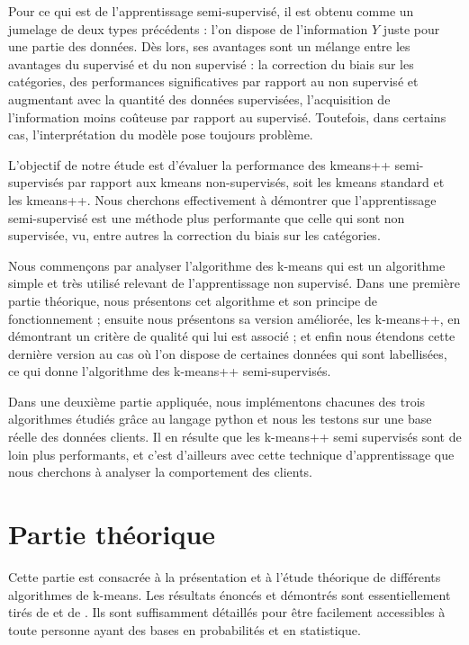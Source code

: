 \documentclass[12pt,a4paper]{book}
\newcommand{\1}{\mathds{1}}
\begin{document}
Pour ce qui est de l'apprentissage semi-supervisé, il est obtenu comme un jumelage de deux types précédents : l'on dispose de l'information $Y$ juste pour une partie des données. Dès lors, ses avantages sont un mélange entre les avantages du supervisé et du non supervisé : la correction du biais sur les catégories, des performances significatives par rapport au non supervisé et augmentant avec la quantité des données supervisées, l'acquisition de l'information moins coûteuse par rapport au supervisé. Toutefois, dans certains cas, l'interprétation du modèle pose toujours problème.


L'objectif de notre étude est d'évaluer la performance des kmeans++ semi-supervisés par rapport aux kmeans non-supervisés, soit les kmeans standard et les kmeans++. Nous cherchons effectivement à démontrer que l'apprentissage semi-supervisé est une méthode plus performante que celle qui sont non supervisée, vu, entre autres la correction du biais sur les catégories.

Nous commençons par analyser l'algorithme des k-means qui est un algorithme simple et très utilisé relevant de l'apprentissage non supervisé. Dans une première partie théorique, nous présentons cet algorithme et son principe de fonctionnement ; ensuite nous présentons sa version améliorée, les k-means++, en démontrant un critère de qualité qui lui est associé ; et enfin nous étendons cette dernière version au cas où l'on dispose de certaines données qui sont labellisées, ce qui donne l'algorithme des k-means++ semi-supervisés. 

Dans une deuxième partie appliquée, nous implémentons chacunes des trois algorithmes étudiés grâce au langage python et nous les testons sur une base réelle des données clients. Il en résulte que les k-means++ semi supervisés sont de loin plus performants, et c'est d'ailleurs avec cette technique d'apprentissage que nous cherchons à analyser la comportement des clients.





\section{Partie théorique}

Cette partie est consacrée à la présentation et à l'étude théorique de différents algorithmes de k-means. Les  résultats énoncés et démontrés sont essentiellement tirés de \cite{DAV2007} et de \cite{JOR2017}. Ils sont suffisamment détaillés pour être facilement accessibles à toute personne ayant des bases en probabilités et en statistique.
\end{document}
